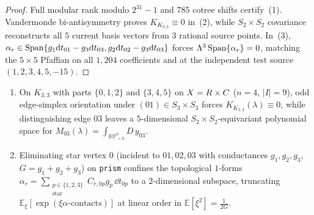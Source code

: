 \begin{proof}
Full modular rank modulo $2^{31}-1$ and $785$ cotree shifts certify~(1). Vandermonde bi-antisymmetry proves $K_{K_{3,3}}\equiv 0$ in~(2), while $S_2\times S_2$ covariance reconstructs all $5$ current basis vectors from $3$ rational source points. In~(3), $\alpha_r \in \operatorname{Span}\{g_1\mathrm{d} t_{01}-g_3\mathrm{d} t_{03}, g_2\mathrm{d} t_{02}-g_3\mathrm{d} t_{03}\}$ forces $\Lambda^3\operatorname{Span}\{\alpha_r\} = 0$, matching the $5\times 5$ Pfaffian on all $1{,}204$ coefficients and at the independent test source $(1,2,3,4,5,-15)$.
\end{proof}

\begin{lemma}
\label{lem:k33-parity-prism}
\leavevmode
\begin{enumerate}[label=(\arabic*),leftmargin=*]
  \item On $K_{3,3}$ with parts $\{0,1,2\}$ and $\{3,4,5\}$ on $X = R\times C$ ($n=4$, $|I|=9$), odd edge-simplex orientation under $(01) \in S_3\times S_3$ forces $K_{K_{3,3}}(\lambda) \equiv 0$, while distinguishing edge $03$ leaves a $5$-dimensional $S_2\times S_2$-equivariant polynomial space for $M_{03}(\lambda) = \int_{\mathbb{RP}^8_{>0}}D\,y_{03}$.

  \item Eliminating star vertex $0$ (incident to $01,02,03$ with conductances $g_1,g_2,g_3$, $G = g_1+g_2+g_3$) on \texttt{prism} confines the topological $1$-forms $\alpha_r = \sum_{\substack{p\in\{1,2,3\}\\\mathrm{star}}}C_{r,0p}g_p\,\dd t_{0p}$ to a $2$-dimensional subspace, truncating $\mathbb{E}_\xi[\exp(\xi\alpha\text{-contacts})]$ at linear order in $\mathbb{E}[\xi^2] = \frac{1}{2G}$.
\end{enumerate}
\end{lemma}

